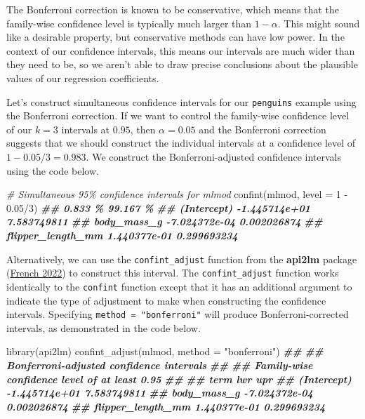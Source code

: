 \documentclass[
]{book}
\newenvironment{Shaded}{\begin{snugshade}}{\end{snugshade}}
\newcommand{\AttributeTok}[1]{\textcolor[rgb]{0.77,0.63,0.00}{#1}}
\newcommand{\CommentTok}[1]{\textcolor[rgb]{0.56,0.35,0.01}{\textit{#1}}}
\newcommand{\DecValTok}[1]{\textcolor[rgb]{0.00,0.00,0.81}{#1}}
\newcommand{\DocumentationTok}[1]{\textcolor[rgb]{0.56,0.35,0.01}{\textbf{\textit{#1}}}}
\newcommand{\FloatTok}[1]{\textcolor[rgb]{0.00,0.00,0.81}{#1}}
\newcommand{\FunctionTok}[1]{\textcolor[rgb]{0.00,0.00,0.00}{#1}}
\newcommand{\NormalTok}[1]{#1}
\newcommand{\SpecialCharTok}[1]{\textcolor[rgb]{0.00,0.00,0.00}{#1}}
\newcommand{\StringTok}[1]{\textcolor[rgb]{0.31,0.60,0.02}{#1}}
\theoremstyle{definition}
\theoremstyle{definition}
\theoremstyle{definition}
\theoremstyle{definition}
\theoremstyle{remark}
\begin{document}
The Bonferroni correction is known to be conservative, which means that the family-wise confidence level is typically much larger than \(1-\alpha\). This might sound like a desirable property, but conservative methods can have low power. In the context of our confidence intervals, this means our intervals are much wider than they need to be, so we aren't able to draw precise conclusions about the plausible values of our regression coefficients.

Let's construct simultaneous confidence intervals for our \texttt{penguins} example using the Bonferroni correction. If we want to control the family-wise confidence level of our \(k=3\) intervals at \(0.95\), then \(\alpha = 0.05\) and the Bonferroni correction suggests that we should construct the individual intervals at a confidence level of \(1-0.05/3=0.983\). We construct the Bonferroni-adjusted confidence intervals using the code below.

\begin{Shaded}
\begin{Highlighting}[]
\CommentTok{\# Simultaneous 95\% confidence intervals for mlmod}
\FunctionTok{confint}\NormalTok{(mlmod, }\AttributeTok{level =} \DecValTok{1} \SpecialCharTok{{-}} \FloatTok{0.05}\SpecialCharTok{/}\DecValTok{3}\NormalTok{)}
\DocumentationTok{\#\#                         0.833 \%    99.167 \%}
\DocumentationTok{\#\# (Intercept)       {-}1.445714e+01 7.583749811}
\DocumentationTok{\#\# body\_mass\_g       {-}7.024372e{-}04 0.002026874}
\DocumentationTok{\#\# flipper\_length\_mm  1.440377e{-}01 0.299693234}
\end{Highlighting}
\end{Shaded}

Alternatively, we can use the \texttt{confint\_adjust} function from the \textbf{api2lm} package (\protect\hyperlink{ref-R-api2lm}{French 2022}) to construct this interval. The \texttt{confint\_adjust} function works identically to the \texttt{confint} function except that it has an additional argument to indicate the type of adjustment to make when constructing the confidence intervals. Specifying \texttt{method\ =\ "bonferroni"} will produce Bonferroni-corrected intervals, as demonstrated in the code below.

\begin{Shaded}
\begin{Highlighting}[]
\FunctionTok{library}\NormalTok{(api2lm)}
\FunctionTok{confint\_adjust}\NormalTok{(mlmod, }\AttributeTok{method =} \StringTok{"bonferroni"}\NormalTok{)}
\DocumentationTok{\#\# }
\DocumentationTok{\#\# Bonferroni{-}adjusted confidence intervals}
\DocumentationTok{\#\# }
\DocumentationTok{\#\# Family{-}wise confidence level of at least 0.95 }
\DocumentationTok{\#\# }
\DocumentationTok{\#\#               term           lwr         upr}
\DocumentationTok{\#\#        (Intercept) {-}1.445714e+01 7.583749811}
\DocumentationTok{\#\#        body\_mass\_g {-}7.024372e{-}04 0.002026874}
\DocumentationTok{\#\#  flipper\_length\_mm  1.440377e{-}01 0.299693234}
\end{Highlighting}
\end{Shaded}
\end{document}
